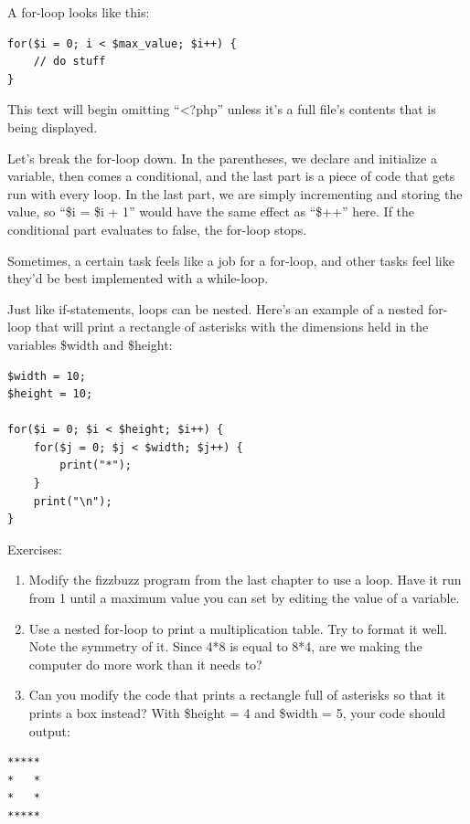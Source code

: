 \documentclass[
]{book}
\begin{document}
A for-loop looks like this:

\begin{verbatim}
for($i = 0; i < $max_value; $i++) {
    // do stuff
}
\end{verbatim}

This text will begin omitting ``\textless?php'' unless it's a full file's contents that is being displayed.

Let's break the for-loop down. In the parentheses, we declare and initialize a variable, then comes a conditional, and the last part is a piece of code that gets run with every loop. In the last part, we are simply incrementing and storing the value, so ``\$i = \$i + 1'' would have the same effect as ``\$++'' here. If the conditional part evaluates to false, the for-loop stops.

Sometimes, a certain task feels like a job for a for-loop, and other tasks feel like they'd be best implemented with a while-loop.

Just like if-statements, loops can be nested. Here's an example of a nested for-loop that will print a rectangle of asterisks with the dimensions held in the variables \$width and \$height:

\begin{verbatim}
$width = 10;
$height = 10;

for($i = 0; $i < $height; $i++) {
    for($j = 0; $j < $width; $j++) {
        print("*");
    }
    print("\n");
}
\end{verbatim}

Exercises:

\begin{enumerate}
\def\labelenumi{\arabic{enumi}.}
\item
  Modify the fizzbuzz program from the last chapter to use a loop. Have it run from 1 until a maximum value you can set by editing the value of a variable.
\item
  Use a nested for-loop to print a multiplication table. Try to format it well. Note the symmetry of it. Since 4*8 is equal to 8*4, are we making the computer do more work than it needs to?
\item
  Can you modify the code that prints a rectangle full of asterisks so that it prints a box instead? With \$height = 4 and \$width = 5, your code should output:
\end{enumerate}

\begin{verbatim}
*****
*   *
*   *
*****
\end{verbatim}
\end{document}
